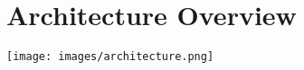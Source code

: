 \documentclass[main.tex]{subfiles}
\begin{document}
	\begingroup

	\renewcommand{\cleardoublepage}{}

	\renewcommand{\clearpage}{}

	\chapter{Architecture Overview}


	

	

  	\texttt{[image: images/architecture.png]}		  	

	\endgroup
\end{document}
